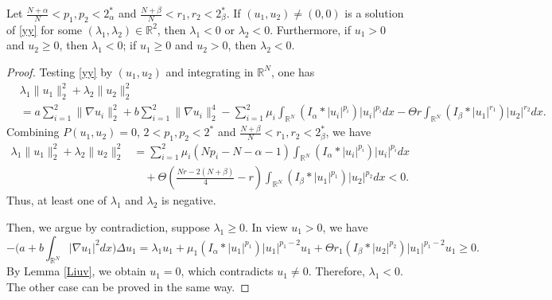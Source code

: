 \documentclass[reqno]{amsart}
\begin{document}
\begin{lemma}\label{zjngz}
Let $\frac{N+\alpha}{N}<p_1,p_2<2_\alpha^*$ and $\frac{N+\beta}{N}<r_1,r_2<2_\beta^*$. 
If $(u_1,u_2)\neq(0,0)$ is a solution of
 \eqref{yy} for some $(\lambda_1,\lambda_2)\in\mathbb{R}^2$, then $\lambda_1<0$ 
 or $\lambda_2<0$. Furthermore, if $u_1>0$ and $u_2\geq0$, then
$\lambda_1<0$; if $u_1\geq0$ and $u_2>0$, then $\lambda_2<0$.
\end{lemma}

\begin{proof}
Testing \eqref{yy} by $(u_1,u_2)$ and integrating in $\mathbb{R}^N$, one has
\begin{align*}
&\lambda_1\| u_1\|_2^2+\lambda_2\| u_2\|_2^2 \\
&=a\sum_{i=1}^2\| \nabla u_i\|_2^2+
b\sum_{i=1}^2\| \nabla u_i\|_2^4-\sum_{i=1}^2\mu_i\int_{\mathbb{R}^N}(I_\alpha\ast|u_i|^{p_i})|u_i|^{p_i}dx-
\Theta r\int_{\mathbb{R}^N}(I_\beta\ast|u_1|^{r_1})|u_2|^{r_2}dx.
\end{align*}
Combining $P(u_1,u_2)=0$, $2<p_1,p_2<2^*$ and $\frac{N+\beta}{N}<r_1,r_2<2_\beta^*$,
we have
 \begin{align*}
 \lambda_1\| u_1\|_2^2+\lambda_2\| u_2\|_2^2
&= \sum_{i=1}^2\mu_i(Np_i-N-\alpha-1)
 \int_{\mathbb{R}^N}(I_\alpha\ast|u_i|^{p_i})|u_i|^{p_i}dx\\
&\quad +\Theta\left(\frac{Nr-2(N+\beta)}{4}-r\right)\int_{\mathbb{R}^N}(I_\beta\ast|u_1|^{p_1})|u_2|^{p_2}dx<0.
 \end{align*}
Thus, at least one of $\lambda_1$ and $\lambda_2$ is negative.

Then, we argue by contradiction, suppose $\lambda_1\geq0$. 
In view $u_1>0$, we have
\[
-\Big(a+b\int_{\mathbb{R}^N}|\nabla u_1|^2dx\Big)\Delta u_1
=\lambda_1u_1+\mu_1(I_\alpha\ast|u_1|^{p_1})|u_1|^{p_1-2}u_1
 +\Theta r_1(I_\beta\ast|u_2|^{p_2})|u_1|^{p_1-2}u_1\geq0.
\]
By Lemma \ref{Liuv}, we obtain $u_1=0$, which  contradicts $u_1\neq0$.
Therefore, $\lambda_1<0$. The other case can be proved
in the same way.
\end{proof}
\end{document}
